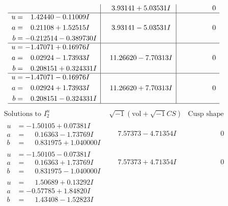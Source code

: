 \documentclass[1p]{elsarticle_modified}
\theoremstyle{definition}
\newcommand{\I}{\sqrt{-1}}
\begin{document}
$$\begin{array}{c|c|c}
 & \phantom{-}3.93141 + 5.03531 I & \phantom{-0.000000 } 0 \\ \hline\begin{aligned}
u &= \phantom{-}1.42440 - 0.11009 I \\
a &= \phantom{-}0.21108 + 1.52515 I \\
b &= -0.212514 - 0.389730 I\end{aligned}
 & \phantom{-}3.93141 - 5.03531 I & \phantom{-0.000000 } 0 \\ \hline\begin{aligned}
u &= -1.47071 + 0.16976 I \\
a &= \phantom{-}0.02924 - 1.73933 I \\
b &= \phantom{-}0.208151 + 0.324331 I\end{aligned}
 & \phantom{-}11.26620 - 7.70313 I & \phantom{-0.000000 } 0 \\ \hline\begin{aligned}
u &= -1.47071 - 0.16976 I \\
a &= \phantom{-}0.02924 + 1.73933 I \\
b &= \phantom{-}0.208151 - 0.324331 I\end{aligned}
 & \phantom{-}11.26620 + 7.70313 I & \phantom{-0.000000 } 0\\
 \hline 
 \end{array}$$\newpage$$\begin{array}{c|c|c}  
\text{Solutions to }I^u_{2}& \I (\text{vol} + \sqrt{-1}CS) & \text{Cusp shape}\\
 \hline 
\begin{aligned}
u &= -1.50105 + 0.07381 I \\
a &= \phantom{-}0.16363 - 1.73769 I \\
b &= \phantom{-}0.831975 + 1.040000 I\end{aligned}
 & \phantom{-}7.57373 - 4.71354 I & \phantom{-0.000000 } 0 \\ \hline\begin{aligned}
u &= -1.50105 - 0.07381 I \\
a &= \phantom{-}0.16363 + 1.73769 I \\
b &= \phantom{-}0.831975 - 1.040000 I\end{aligned}
 & \phantom{-}7.57373 + 4.71354 I & \phantom{-0.000000 } 0 \\ \hline\begin{aligned}
u &= \phantom{-}1.50689 + 0.13292 I \\
a &= -0.57785 + 1.84820 I \\
b &= \phantom{-}1.43408 - 1.52823 I\end{aligned}

\end{array}$$
\end{document}
